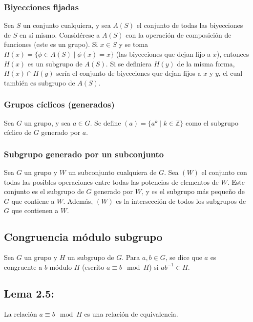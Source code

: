 \documentclass{article}
\begin{document}
\subsubsection*{\color{teal} Biyecciones fijadas}

Sea $S$ un conjunto cualquiera, y sea $A(S)$ el conjunto de todas las biyecciones de $S$ en sí mismo. Considérese a $A(S)$ con la operación de composición de funciones (este es un grupo). Si $x\in S$ y se toma $H(x)=\{\phi\in A(S)\mid \phi(x)=x\}$ (las biyecciones que dejan fijo a $x$), entonces $H(x)$ es un subgrupo de $A(S)$. Si se definiera $H(y)$ de la misma forma, $H(x)\cap H(y)$ sería el conjunto de biyecciones que dejan fijos a $x$ y $y$, el cual también es subgrupo de $A(S)$.

\subsubsection*{\color{teal} Grupos cíclicos (generados)}

Sea $G$ un grupo, y sea $a\in G$. Se define $(a)=\{a^k\mid k\in\mathbb{Z}\}$ como el subgrupo cíclico de $G$ generado por $a$.

\subsubsection*{\color{teal} Subgrupo generado por un subconjunto}

Sea $G$ un grupo y $W$ un subconjunto cualquiera de $G$. Sea $(W)$ el conjunto con todas las posibles operaciones entre todas las potencias de elementos de $W$. Este conjunto es el subgrupo de $G$ generado por $W$, y es el subgrupo más pequeño de $G$ que contiene a $W$. Además, $(W)$ es la intersección de todos los subgrupos de $G$ que contienen a $W$.

\subsection*{\color{violet} Congruencia módulo subgrupo}

Sea $G$ un grupo y $H$ un subgrupo de $G$. Para $a,b\in G$, se dice que $a$ es congruente a $b$ módulo $H$ (escrito $a\equiv b \mod H$) si $ab^{-1}\in H$.

\subsection*{\color{blue} Lema 2.5:}

La relación $a\equiv b \mod H$ es una relación de equivalencia.
\end{document}
